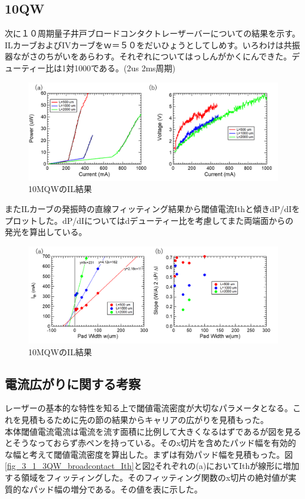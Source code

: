 \subsection{10QW}%
次に１０周期量子井戸ブロードコンタクトレーザーバーについての結果を示す。ILカーブおよびIVカーブをｗ＝５０をだいひょうとしてしめす。いろわけは共振器ながさのちがいをあらわす。それぞれについてはっしんがかくにんできた。デューティー比は1対1000である。(2us 2ms周期)
\begin{figure}[h]
	\centering
	\includegraphics[width=15cm]{figure/fig_3_1_10QW_broadcontact_IL.png}
		\caption{10MQWのIL結果}
		\label{fig_3_1_10QW_broadcontact_IL}
\end{figure}
またILカーブの発振時の直線フィッティング結果から閾値電流Ithと傾きdP/dIをプロットした。dP/dIについてはdデューティー比を考慮してまた両端面からの発光を算出している。
\begin{figure}[h]
	\centering
	\includegraphics[width=15cm]{figure/fig_3_1_10QW_broadcontact_Ith.png}
		\caption{10MQWのIL結果}
		\label{fig_3_1_10QW_broadcontact_Ith}
\end{figure}


\newpage
\subsection{電流広がりに関する考察}%
レーザーの基本的な特性を知る上で閾値電流密度が大切なパラメータとなる。これを見積もるために先の節の結果からキャリアの広がりを見積もった。\\
 本体閾値電流電流は電流を流す面積に比例して大きくなるはずであるが図を見るとそうなっておらず赤ペンを持っている。そのx切片を含めたパッド幅を有効的な幅と考えて閾値電流密度を算出した。まずは有効パッド幅を見積もった。図\ref{fig_3_1_3QW_broadcontact_Ith}と図\ref{fig_3_1_10QW_broadcontact_Ith}それぞれの(a)においてIthが線形に増加する領域をフィッティングした。そのフィッティング関数のx切片の絶対値が実質的なパッド幅の増分である。その値を表に示した。
 
